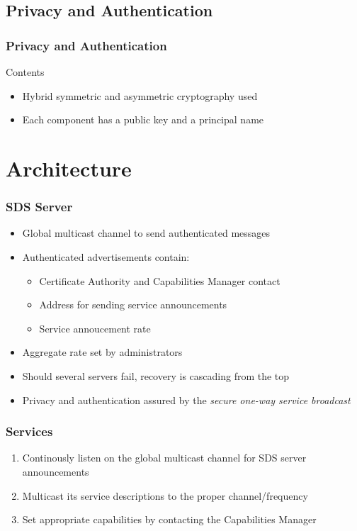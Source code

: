 \documentclass{beamer}
\begin{document}
\subsection{Privacy and Authentication}

\begin{frame}
\frametitle{Privacy and Authentication}
\begin{block}{Contents}
\begin{itemize}
\item Hybrid symmetric and asymmetric cryptography used 
\item Each component has a public key and a principal name
\end{itemize}
\end{block}
\end{frame}

\section{Architecture}
\begin{frame}
\frametitle{SDS Server}
\begin{itemize}
\item Global multicast channel to send authenticated messages
\item Authenticated advertisements contain:
\begin{itemize}
\item Certificate Authority and Capabilities Manager contact
\item Address for sending service announcements
\item Service annoucement rate
\end{itemize}
\item Aggregate rate set by administrators
\item Should several servers fail, recovery is cascading from the top
\item Privacy and authentication assured by the {\it secure one-way service broadcast}
\end{itemize}
\end{frame}


\begin{frame} %
\frametitle{Services}
\begin{enumerate}
\item \alert<+>{Continously listen on the global multicast channel for SDS server announcements}
\item \alert<+>{Multicast its service descriptions to the proper channel/frequency}
\item \alert<+>{Set appropriate capabilities by contacting the Capabilities Manager}
\end{enumerate}
\end{frame}
\end{document}
